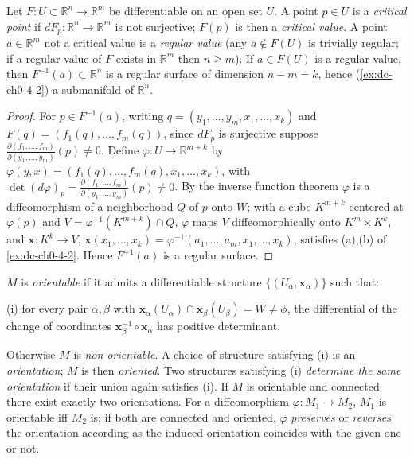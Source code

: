 \begin{example}
  \label{ex:dc-ch0-4-3}
  \notready
  Let $F:U\subset\mathbb{R}^n\to\mathbb{R}^m$ be differentiable on an open set $U$.
  A point $p\in U$ is a \emph{critical point} if $dF_p:\mathbb{R}^n\to\mathbb{R}^m$ is
  not surjective; $F(p)$ is then a \emph{critical value}. A point $a\in\mathbb{R}^m$ not
  a critical value is a \emph{regular value} (any $a\notin F(U)$ is trivially regular; if
  a regular value of $F$ exists in $\mathbb{R}^m$ then $n\ge m$). If $a\in F(U)$ is
  a regular value, then $F^{-1}(a)\subset\mathbb{R}^n$ is a regular surface of
  dimension $n-m=k$, hence (\cref{ex:dc-ch0-4-2}) a submanifold of $\mathbb{R}^n$.
\end{example}
\begin{proof}
  \sketch
  For $p\in F^{-1}(a)$, writing $q=(y_1,\dots,y_m,x_1,\dots,x_k)$ and
  $F(q)=(f_1(q),\dots,f_m(q))$, since $dF_p$ is surjective suppose
  $\frac{\partial(f_1,\dots,f_m)}{\partial(y_1,\dots,y_m)}(p)\neq0$. Define
  $\varphi:U\to\mathbb{R}^{m+k}$ by
  $\varphi(y,x)=(f_1(q),\dots,f_m(q),x_1,\dots,x_k)$, with
  $\det(d\varphi)_p=\frac{\partial(f_1,\dots,f_m)}{\partial(y_1,\dots,y_m)}(p)\neq0$.
  By the inverse function theorem $\varphi$ is a diffeomorphism of a neighborhood
  $Q$ of $p$ onto $W$; with a cube $K^{m+k}$ centered at $\varphi(p)$ and
  $V=\varphi^{-1}(K^{m+k})\cap Q$, $\varphi$ maps $V$ diffeomorphically onto
  $K^m\times K^k$, and $\mathbf{x}:K^k\to V$,
  $\mathbf{x}(x_1,\dots,x_k)=\varphi^{-1}(a_1,\dots,a_m,x_1,\dots,x_k)$, satisfies
  (a),(b) of \cref{ex:dc-ch0-4-2}. Hence $F^{-1}(a)$ is a regular surface.
\end{proof}

\begin{definition}
  \label{def:dc-ch0-4-4}
  \leanok
  $M$ is \emph{orientable} if it admits a differentiable structure
  $\{(U_\alpha,\mathbf{x}_\alpha)\}$ such that:
  
  (i) for every pair $\alpha,\beta$ with
  $\mathbf{x}_\alpha(U_\alpha)\cap\mathbf{x}_\beta(U_\beta)=W\neq\phi$, the
  differential of the change of coordinates
  $\mathbf{x}_\beta^{-1}\circ\mathbf{x}_\alpha$ has positive determinant.
  
  Otherwise $M$ is \emph{non-orientable}. A choice of structure satisfying (i) is an
  \emph{orientation}; $M$ is then \emph{oriented}. Two structures satisfying (i) \emph{determine
  the same orientation} if their union again satisfies (i). If $M$ is orientable and
  connected there exist exactly two orientations. For a diffeomorphism
  $\varphi:M_1\to M_2$, $M_1$ is orientable iff $M_2$ is; if both are connected and
  oriented, $\varphi$ \emph{preserves} or \emph{reverses} the orientation according as the
  induced orientation coincides with the given one or not.
\end{definition}

